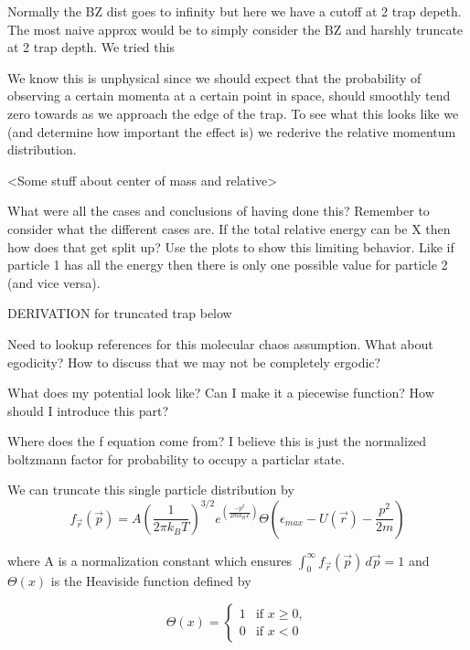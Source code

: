 Normally the BZ dist goes to infinity but here we have a cutoff at 2 trap depeth.
The most naive approx would be to simply consider the BZ and harshly truncate at 2 trap depth. We tried this

We know this is unphysical since we should expect that the probability of observing a certain momenta at a certain point in space, should smoothly tend zero towards as we approach the edge of the trap.
To see what this looks like we (and determine how important the effect is) we rederive the relative momentum distribution.

<Some stuff about center of mass and relative>

What were all the cases and conclusions of having done this? Remember to consider what the different cases are. If the total relative energy can be X then how does that get split up? Use the plots to show this limiting behavior. Like if particle 1 has all the energy then there is only one possible value for particle 2 (and vice versa).


DERIVATION for truncated trap below

Need to lookup references for this molecular chaos assumption. What about egodicity? How to discuss that we may not be completely ergodic?

What does my potential look like? Can I make it a piecewise function? How should I introduce this part?

Where does the f equation come from? I believe this is just the normalized boltzmann factor for probability to occupy a particlar state.

\noindent
We can truncate this single particle distribution by 
\begin{equation}
\label{eq:trun_single_particle_prob}
		 f_{ \vec{r} }( \vec{p} ) = A \left(\frac{1}{2 \pi k_B T}\right)^{3/2} e^{\left(\frac{-p^2}{2 m k_B T}\right)} \Theta \left( \epsilon_{max} - U( \vec{r} ) - \frac{p^2}{2 m} \right)
\end{equation}

\noindent
where A is a normalization constant which ensures $\int_0^\infty f_{ \vec{r} }( \vec{p} )\,d \vec{p} = 1 $ and $\Theta(x)$ is the Heaviside function defined by

\begin{equation}
\label{eq:heaviside}
	\Theta(x)=
	\begin{cases}
		1 &\text{if } x \geq 0, \\
		0 &\text{if } x < 0
	\end{cases}
\end{equation}

